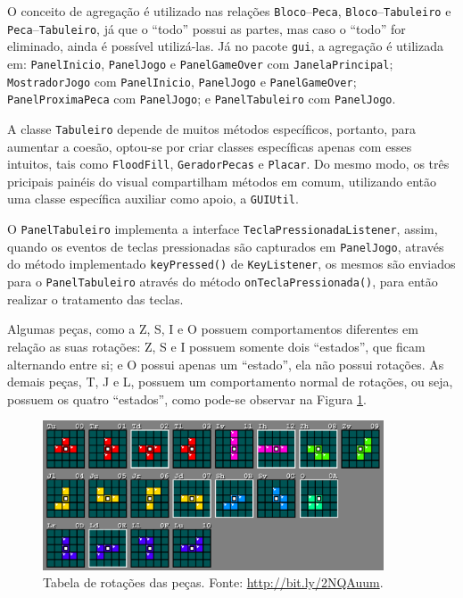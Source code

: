 \documentclass[a4paper, 12pt]{article}
\begin{document}
  O conceito de agregação é utilizado nas relações \texttt{Bloco}--\texttt{Peca},
  \texttt{Bloco}--\texttt{Tabuleiro} e \texttt{Peca}--\texttt{Tabuleiro},
  já que o ``todo'' possui as partes, mas caso o ``todo'' for eliminado,
  ainda é possível utilizá-las. Já no pacote \texttt{gui}, a agregação
  é utilizada em: \texttt{PanelInicio}, \texttt{PanelJogo} e \texttt{PanelGameOver}
  com \texttt{JanelaPrincipal}; \texttt{MostradorJogo} com \texttt{PanelInicio}, 
  \texttt{PanelJogo} e \texttt{PanelGameOver}; \texttt{PanelProximaPeca}
  com \texttt{PanelJogo}; e \texttt{PanelTabuleiro} com \texttt{PanelJogo}.

  A classe \texttt{Tabuleiro} depende de muitos métodos específicos,
  portanto, para aumentar a coesão, optou-se por criar classes específicas
  apenas com esses intuitos, tais como \texttt{FloodFill}, \texttt{GeradorPecas}
  e \texttt{Placar}. Do mesmo modo, os três pricipais painéis do visual
  compartilham métodos em comum, utilizando então uma classe específica
  auxiliar como apoio, a \texttt{GUIUtil}.

  O \texttt{PanelTabuleiro} implementa a interface \texttt{TeclaPressionadaListener},
  assim, quando os eventos de teclas pressionadas são capturados em \texttt{PanelJogo},
  através do método implementado \texttt{keyPressed()} de \texttt{KeyListener},
  os mesmos são enviados para o \texttt{PanelTabuleiro} através do método
  \texttt{onTeclaPressionada()}, para então realizar o tratamento das teclas.

  Algumas peças, como a Z, S, I e O possuem comportamentos diferentes em
  relação as suas rotações: Z, S e I possuem somente dois ``estados'',
  que ficam alternando entre si; e O possui apenas um ``estado'', ela
  não possui rotações. As demais peças, T, J e L, possuem um comportamento
  normal de rotações, ou seja, possuem os quatro ``estados'', como pode-se
  observar na Figura \ref{fig:rotacoes}.
  
  \begin{figure}[ht]
    \centering
    \includegraphics[width=0.9\textwidth]{0.png}
    \caption{Tabela de rotações das peças. Fonte: \url{http://bit.ly/2NQAuum}.}
    \label{fig:rotacoes}
  \end{figure}
\end{document}
